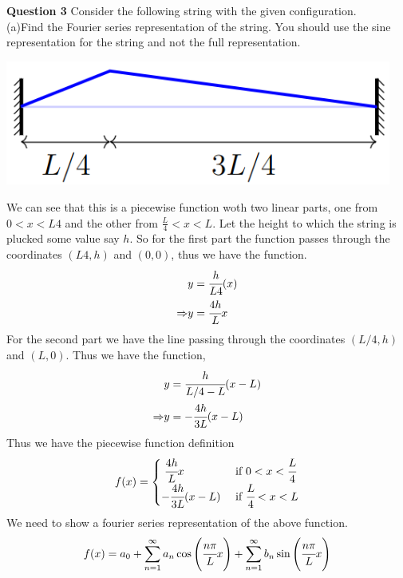 \documentclass[addpoints]{exam}
\begin{document}
\begin{questions}
\begin{solution}
\end{solution}
\question\textbf{Question 3}
Consider the following string with the given configuration.\\
(a)Find the Fourier series representation of the string. You should use the sine representation for the string and not the full representation.\\ 
\begin{center}
    \includegraphics[width = 5.0in]{q2.png}
\end{center}
\begin{solution}
    We can see that this is a piecewise function woth two linear parts, one from $0<x<{L}{4}$ and the other from $\frac{L}{4}<x<L$. Let the height to which the string is plucked
    some value say $h$. So for the first part the function passes through the coordinates $({L}{4},h)$ and $(0,0)$, thus we have the function.    \begin{align*}
        & y = \cfrac{h}{{L}{4}} (x) \\ 
        \Rightarrow& y = \cfrac{4h}{L}x
    \end{align*}
    For the second part we have the line passing through the coordinates $(L/4,h)$ and $(L,0)$. Thus we have the function,
    \begin{align*}
        & y = \cfrac{h}{L/4-L}(x-L)\\ 
        \Rightarrow& y = -\cfrac{4h}{3L}(x-L)
    \end{align*}
    Thus we have the piecewise function definition
    \begin{equation*}
        f(x) =
        \begin{cases}
            \;\cfrac{4h}{L}x & \text{ if } 0<x<\cfrac{L}{4} \\
            -\cfrac{4h}{3L}(x-L)& \text{ if  } \cfrac{L}{4}<x<L
        \end{cases}
    \end{equation*}
    We need to show a fourier series representation of the above function. 
    \begin{align*}
        f(x) = a_0 + \sum_{n=1}^\infty a_n\cos\left(\cfrac{n\pi}{L}x\right) + \sum_{n=1}^\infty b_n\sin\left(\cfrac{n\pi}{L}x\right)

\end{align*}
\end{solution}
\end{questions}
\end{document}
